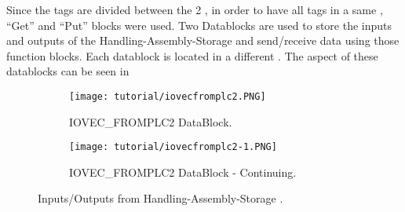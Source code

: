 \begin{observation}
  Since the tags are divided between the 2 \PLCs{}, in order to have all tags in
  a same \PLC, ``Get'' and ``Put'' blocks were used. Two Datablocks
  are used to store the inputs and outputs of the Handling-Assembly-Storage \PLC{} and send\slash receive data using those function blocks.
  Each datablock is located in a different \PLC.
  The aspect of these datablocks can be seen in 
\end{observation}
\begin{figure}[H] \centering
\begin{subfigure}[h]{\textwidth} \centering
 \texttt{[image: tutorial/iovecfromplc2.PNG]}
  \caption{IOVEC\_FROMPLC2 DataBlock.}
  \label{fig:iovecFromPlc}
\end{subfigure}
\begin{subfigure}[h]{\textwidth} \centering
 \texttt{[image: tutorial/iovecfromplc2-1.PNG]}
  \caption{IOVEC\_FROMPLC2 DataBlock - Continuing.}
  \label{fig:iovecFromPlctwo}
\end{subfigure}
\caption{Inputs\slash Outputs from Handling-Assembly-Storage \PLC.}
\end{figure}

